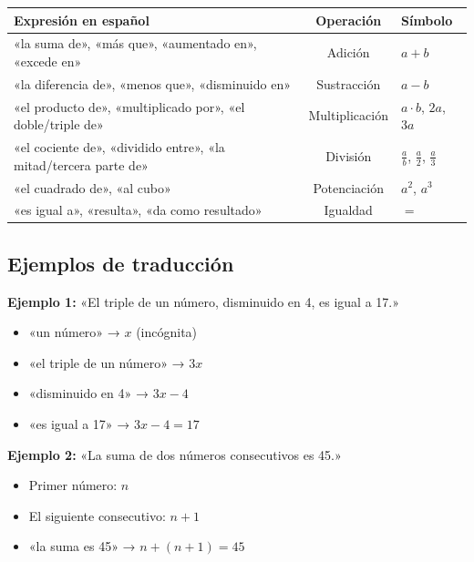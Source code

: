 \documentclass[12pt, letterpaper]{article}
\begin{document}
\begin{center}
  \small
  \begin{tabular}{p{5.5cm} c p{4cm}}
    \toprule
    \textbf{Expresión en español}                                   & \textbf{Operación} & \textbf{Símbolo}                            \\
    \midrule
    «la suma de», «más que», «aumentado en», «excede en»            & Adición            & $a + b$                                     \\
    «la diferencia de», «menos que», «disminuido en»                & Sustracción        & $a - b$                                     \\
    «el producto de», «multiplicado por», «el doble/triple de»      & Multiplicación     & $a \cdot b$, $2a$, $3a$                     \\
    «el cociente de», «dividido entre», «la mitad/tercera parte de» & División           & $\frac{a}{b}$, $\frac{a}{2}$, $\frac{a}{3}$ \\
    «el cuadrado de», «al cubo»                                     & Potenciación       & $a^2$, $a^3$                                \\
    «es igual a», «resulta», «da como resultado»                    & Igualdad           & $=$                                         \\
    \bottomrule
  \end{tabular}
\end{center}

\subsection{Ejemplos de traducción}

\noindent\textbf{Ejemplo 1:} «El triple de un número, disminuido en 4, es igual a 17.»
\begin{itemize}
  \item «un número» → $x$ (incógnita)
  \item «el triple de un número» → $3x$
  \item «disminuido en 4» → $3x - 4$
  \item «es igual a 17» → $3x - 4 = 17$
\end{itemize}

\noindent\textbf{Ejemplo 2:} «La suma de dos números consecutivos es 45.»
\begin{itemize}
  \item Primer número: $n$
  \item El siguiente consecutivo: $n + 1$
  \item «la suma es 45» → $n + (n + 1) = 45$
\end{itemize}
\end{document}
